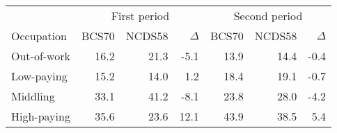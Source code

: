 
\begin{tabular}{lrrrrrr}
\toprule
\multicolumn{1}{c}{} & \multicolumn{3}{c}{First period} & \multicolumn{3}{c}{Second period} \\
\cmidrule(l{3pt}r{3pt}){2-4} \cmidrule(l{3pt}r{3pt}){5-7}
Occupation & BCS70 & NCDS58 & $\Delta$ & BCS70 & NCDS58 & $\Delta$\\
\midrule
Out-of-work & 16.2 & 21.3 & -5.1 & 13.9 & 14.4 & -0.4\\
Low-paying & 15.2 & 14.0 & 1.2 & 18.4 & 19.1 & -0.7\\
Middling & 33.1 & 41.2 & -8.1 & 23.8 & 28.0 & -4.2\\
High-paying & 35.6 & 23.6 & 12.1 & 43.9 & 38.5 & 5.4\\
\bottomrule
\end{tabular}
